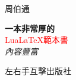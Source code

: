 \begin{titlepage} %

  \raggedleft %

  \vspace*{\baselineskip} %


  {\Large 周伯通} %

  \vspace*{0.167\textheight} %


  \textbf{\LARGE 一本非常厚的}\\[\baselineskip] %

  {\textcolor{Red}{\Huge Lua\LaTeX{}範本書}}\\[\baselineskip] %

  {\Large \textit{內容豐富}} %

  \vfill %


  {\large 左右手互擊出版社~~\plogo} %

  \vspace*{3\baselineskip} %

\end{titlepage}



